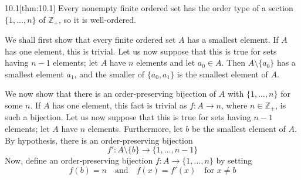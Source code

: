 \begin{thmBox}{10.1}[thm:10.1]
    Every nonempty finite ordered set has the order type of a section
    \( \{ 1, \ldots, n \} \) of \( \mathbb{Z}_{ + } \), so it is well-ordered.

    \baseRule

    \begin{proofBox}
        We shall first show that every finite ordered set \( A \) has a smallest 
        element.
        If \( A \) has one element, this is trivial.
        Let us now suppose that this is true for sets having \( n - 1 \) elements; let
        \( A \) have \( n \) elements and let \( a_{ 0 } \in A \).
        Then \( A \setminus \{ a_{ 0 } \} \) has a smallest element \( a_{ 1 } \), and 
        the smaller of \( \{ a_{ 0 }, a_{ 1 } \} \) is the smallest element of \( A \).

        \baseSkip

        We now show that there is an order-preserving bijection of \( A \) with 
        \( \{ 1 , \ldots , n \} \) for some \( n \).
        If \( A \) has one element, this fact is trivial as \( f: A \rightarrow n \), 
        where \( n \in \mathbb{Z}_{ + } \), is such a bijection.
        Let us now suppose that this is true for sets having \( n - 1 \) elements; let
        \( A \) have \( n \) elements.  
        Furthermore, let \( b \) be the smallest element of \( A \).
        By hypothesis, there is an order-preserving bijection
        \begin{equation*}
            f': A \setminus \{ b \} \rightarrow \{ 1 , \ldots , n - 1 \} 
        \end{equation*}
        Now, define an order-preserving bijection 
        \( f: A \rightarrow \{ 1 , \ldots , n \} \) by setting 
        \begin{equation*}
            f ( b ) = n
            \quad \mathrm{and} \quad 
            f ( x ) = f' ( x ) \quad \text{for } x \neq b   
        \end{equation*}
    \end{proofBox}
\end{thmBox}

